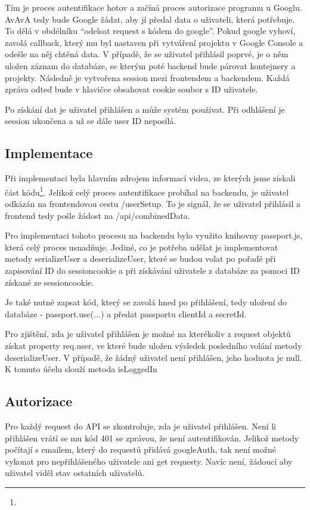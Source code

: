 \documentclass[a4paper,oneside,12pt]{report}
\begin{document}
Tím je proces autentifikace hotov a začíná proces autorizace programu u Googlu.
AvAvA tedy bude Google žádat, aby jí předal data o uživateli, která potřebuje.
To dělá v obdélníku “odelsat request s kódem do google”.
Pokud google vyhoví, zavolá callback, který mu byl nastaven při vytváření projektu v Google Console a odešle na něj chtěná data.
V případě, že se uživatel přihlásil poprvé, je o něm uložen záznam do databáze, se kterým poté backend bude párovat kontejnery a projekty.
Následně je vytvořena session mezi frontendem a backendem. Každá zpráva odteď bude v hlavičce obsahovat cookie soubor s ID uživatele.

Po získání dat je uživatel přihlášen a může systém používat. Při odhlášení je session ukončena a už se dále user ID neposílá.

\subsection{Implementace}


Při implementaci byla hlavním zdrojem informací videa, ze kterých jsme získali část kódu\footnote{}.
Jelikož celý proces autentifikace probíhal na backendu, je uživatel odkázán na frontendovou cestu /userSetup. To je signál, že se uživatel přihlásil a frontend tedy pošle žádost na /api/combinedData.

Pro implementaci tohoto procesu na backendu bylo využito knihovny passport.js, která celý proces usnadňuje. Jediné, co je potřeba udělat je implementovat metody serializeUser a deserializeUser, které se budou volat po pořadě při zapisování ID do sessioncookie a při získávání uživatele z databáze za pomoci ID získané ze sessioncookie.

Je také nutné zapsat kód, který se zavolá hned po přihlášení, tedy uložení do databáze - passport.use(...) a předat passportu clientId a secretId.

Pro zjištění, zda je uživatel přihlášen je možné na kterékoliv z request objektů získat property req.user, ve které bude uložen výsledek posledního volání metody deserializeUser. V případě, že žádný uživatel není přihlášen, jeho hodnota je null. K tomuto účelu slouží metoda isLoggedIn


\subsection{Autorizace}

Pro každý request do API se zkontroluje, zda je uživatel přihlášen.
Není li přihlášen vrátí se mu kód 401 se zprávou, že není autentifikován.
Jelikož metody počítají s emailem, který do requestů přidává googleAuth, tak není možné vykonat pro nepřihlášeného uživatele ani get requesty.
Navíc není, žádoucí aby uživatel viděl stav ostatních uživatelů.
\end{document}
